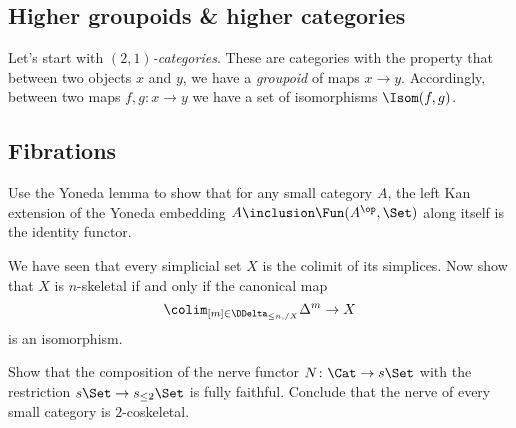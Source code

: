 \subsection{Higher groupoids \& higher categories}%
\label{sub:Highergroupoidshighercategories}
Let's start with \emph{$(2,1)$-categories}.
These are categories with the property that between two objects $x$ and $y$, we have a \emph{groupoid} of maps $x \to y$.
Accordingly, between two maps $f,g \colon x \to y$ we have a set of isomorphisms $\Isom(f,g)$.

\subsection{Fibrations}%
\label{sub:Fibrations}

\begin{exercises}
  \item%
    \label{exercise:stronggeneration}
    Use the Yoneda lemma to show that for any small category $A$,
    the left Kan extension of the Yoneda embedding $A \inclusion \Fun(A^{\op}, \Set)$ along itself is the identity functor.
  \item%
    \label{exercise:nskeletonascolimit}
    We have seen that every simplicial set $X$ is the colimit of its simplices.
    Now show that $X$ is $n$-skeletal if and only if the canonical map
    \[
      \colim_{[m] \in \DDelta_{\leq n, /X}} \Delta^m \to X
    \]
    is an isomorphism.
  \item%
    \label{exercise:nerve2cosk}
    Show that the composition of the nerve functor $N \colon \Cat \to s\Set$ with the restriction $s\Set \to s_{\leq 2}\Set$ is fully faithful.
    Conclude that the nerve of every small category is $2$-coskeletal.
\end{exercises}


